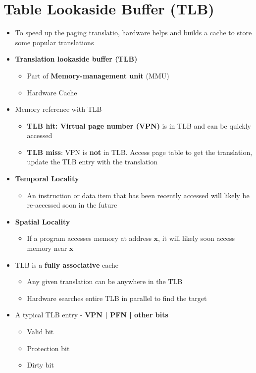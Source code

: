 \documentclass[a4paper,11pt,english]{article}
\begin{document}
\section*{Table Lookaside Buffer (TLB)}
\begin{itemize}
    \item To speed up the paging translatio, hardware helps and builds a cache to store some popular translations
    \item \textbf{\color{blue} Translation lookaside buffer (TLB)}
        \begin{itemize}
            \item Part of \textbf{\color{blue} Memory-management unit} (MMU)
            \item Hardware Cache
        \end{itemize}
    \item Memory reference with TLB
        \begin{itemize}
            \item \textbf{\color{blue} TLB hit: Virtual page number (VPN)} is in TLB and can be quickly accessed
            \item \textbf{\color{red} TLB miss}: VPN is \textbf{\color{red} not} in TLB. Access page table to get the translation, update the TLB entry with the translation
        \end{itemize}
    \item \textbf{\color{blue} Temporal Locality}
        \begin{itemize}
            \item An instruction or data item that has been recently accessed will likely be re-accessed soon in the future
        \end{itemize}
    \item \textbf{\color{blue} Spatial Locality}
        \begin{itemize}
            \item If a program accesses memory at address $\mathbf{x}$, it will likely soon access memory near $\mathbf{x}$
        \end{itemize}
    \item TLB is a \textbf{\color{blue} fully associative} cache
        \begin{itemize}
            \item Any given translation can be anywhere in the TLB
            \item Hardware searches entire TLB in parallel to find the target
        \end{itemize}
    \item A typical TLB entry - \textbf{VPN | PFN | other bits}
        \begin{itemize}
            \item Valid bit
            \item Protection bit
            \item Dirty bit
        \end{itemize}
\end{itemize}
\end{document}
